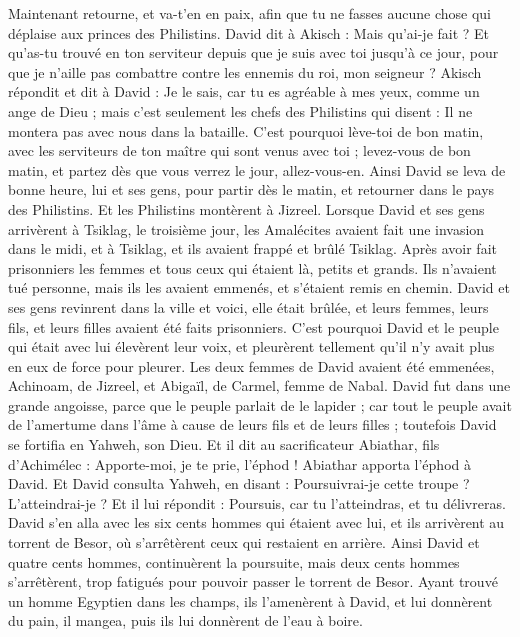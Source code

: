 \begin{multicols}{2}
Maintenant retourne, et va-t'en en paix, afin que tu ne fasses aucune chose qui déplaise aux princes des Philistins.
David dit à Akisch : Mais qu'ai-je fait ? Et qu'as-tu trouvé en ton serviteur depuis que je suis avec toi jusqu'à ce jour, pour que je n'aille pas combattre contre les ennemis du roi, mon seigneur ?
Akisch répondit et dit à David : Je le sais, car tu es agréable à mes yeux, comme un ange de Dieu ; mais c'est seulement les chefs des Philistins qui disent : Il ne montera pas avec nous dans la bataille.
C'est pourquoi lève-toi de bon matin, avec les serviteurs de ton maître qui sont venus avec toi ; levez-vous de bon matin, et partez dès que vous verrez le jour, allez-vous-en.
Ainsi David se leva de bonne heure, lui et ses gens, pour partir dès le matin, et retourner dans le pays des Philistins. Et les Philistins montèrent à Jizreel.
\VerseOne{}Lorsque David et ses gens arrivèrent à Tsiklag, le troisième jour, les Amalécites avaient fait une invasion dans le midi, et à Tsiklag, et ils avaient frappé et brûlé Tsiklag.
Après avoir fait prisonniers les femmes et tous ceux qui étaient là, petits et grands. Ils n’avaient tué personne, mais ils les avaient emmenés, et s’étaient remis en chemin.
David et ses gens revinrent dans la ville et voici, elle était brûlée, et leurs femmes, leurs fils, et leurs filles avaient été faits prisonniers.
C’est pourquoi David et le peuple qui était avec lui élevèrent leur voix, et pleurèrent tellement qu’il n’y avait plus en eux de force pour pleurer.
Les deux femmes de David avaient été emmenées, Achinoam, de Jizreel, et Abigaïl, de Carmel, femme de Nabal.
David fut dans une grande angoisse, parce que le peuple parlait de le lapider ; car tout le peuple avait de l’amertume dans l’âme à cause de leurs fils et de leurs filles ; toutefois David se fortifia en Yahweh, son Dieu.
Et il dit au sacrificateur Abiathar, fils d’Achimélec : Apporte-moi, je te prie, l’éphod ! Abiathar apporta l'éphod à David.
Et David consulta Yahweh, en disant : Poursuivrai-je cette troupe ? L’atteindrai-je ? Et il lui répondit : Poursuis, car tu l’atteindras, et tu délivreras.
David s’en alla avec les six cents hommes qui étaient avec lui, et ils arrivèrent au torrent de Besor, où s’arrêtèrent ceux qui restaient en arrière.
Ainsi David et quatre cents hommes, continuèrent la poursuite, mais deux cents hommes s’arrêtèrent, trop fatigués pour pouvoir passer le torrent de Besor.
Ayant trouvé un homme Egyptien dans les champs, ils l’amenèrent à David, et lui donnèrent du pain, il mangea, puis ils lui donnèrent de l’eau à boire.

\end{multicols}
